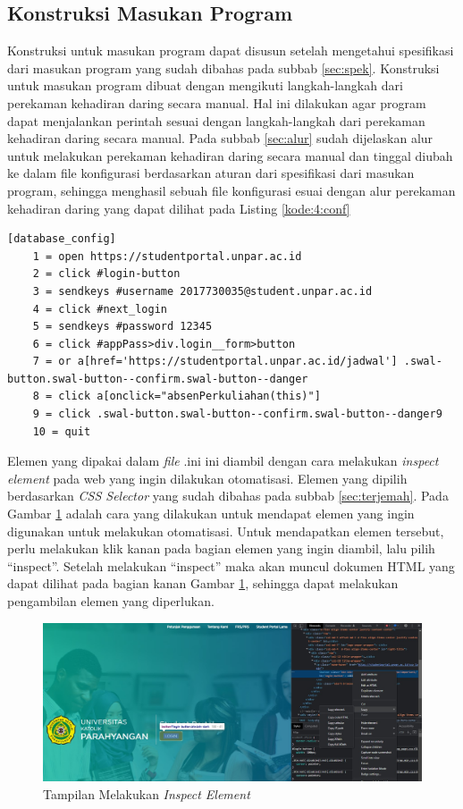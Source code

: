 \subsection{Konstruksi Masukan Program}
Konstruksi untuk masukan program dapat disusun setelah mengetahui spesifikasi dari masukan program yang sudah dibahas pada subbab \ref{sec:spek}. Konstruksi untuk masukan program dibuat dengan mengikuti langkah-langkah dari perekaman kehadiran daring secara manual. Hal ini dilakukan agar program dapat menjalankan perintah sesuai dengan langkah-langkah dari perekaman kehadiran daring secara manual. Pada subbab \ref{sec:alur} sudah dijelaskan alur untuk melakukan perekaman kehadiran daring secara manual dan tinggal diubah ke dalam file konfigurasi berdasarkan aturan dari spesifikasi dari masukan program, sehingga menghasil sebuah file konfigurasi esuai dengan alur perekaman kehadiran daring yang dapat dilihat pada Listing \ref{kode:4:conf}
\begin{lstlisting}[caption=Contoh \textit{file} .ini untuk Masukan Perangkat Lunak Perekaman Kehadiran Daring Otomatis, label=kode:4:conf]
	[database_config]
	1 = open https://studentportal.unpar.ac.id
	2 = click #login-button
	3 = sendkeys #username 2017730035@student.unpar.ac.id 
	4 = click #next_login
	5 = sendkeys #password 12345
	6 = click #appPass>div.login__form>button
	7 = or a[href='https://studentportal.unpar.ac.id/jadwal'] .swal-button.swal-button--confirm.swal-button--danger
	8 = click a[onclick="absenPerkuliahan(this)"]
	9 = click .swal-button.swal-button--confirm.swal-button--danger9
	10 = quit
\end{lstlisting}
Elemen yang dipakai dalam \textit{file} .ini ini diambil dengan cara melakukan \textit{inspect element} pada web yang ingin dilakukan otomatisasi. Elemen yang dipilih berdasarkan \textit{CSS Selector} yang sudah dibahas pada subbab \ref{sec:terjemah}. Pada Gambar \ref{fig:inspect} adalah cara yang dilakukan untuk mendapat elemen yang ingin digunakan untuk melakukan otomatisasi. Untuk mendapatkan elemen tersebut, perlu melakukan klik kanan pada bagian elemen yang ingin diambil, lalu pilih ``inspect''. Setelah melakukan ``inspect'' maka akan muncul dokumen HTML yang dapat dilihat pada bagian kanan Gambar \ref{fig:inspect}, sehingga dapat melakukan pengambilan elemen yang diperlukan.
\begin{figure}[H]
	\centering
	\includegraphics[scale=0.3]{Gambar/elemen.jpg}
	\caption{Tampilan Melakukan \textit{Inspect Element}} 
	\label{fig:inspect}
\end{figure}	

